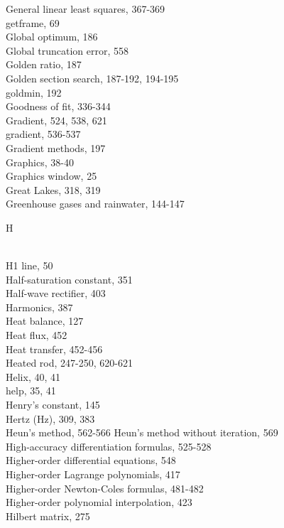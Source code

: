 \documentclass[../main.tex]{subfiles}
\begin{document}
\begin{multicols}{3}
    General linear least squares, 367-369\\
    getframe, 69\\
    Global optimum, 186\\
    Global truncation error, 558\\
    Golden ratio, 187\\
    Golden section search, 187-192, 194-195\\
    goldmin, 192\\
    Goodness of fit, 336-344\\
    Gradient, 524, 538, 621\\
    gradient, 536-537\\
    Gradient methods, 197\\
    Graphics, 38-40\\
    Graphics window, 25\\
    Great Lakes, 318, 319\\
    Greenhouse gases and rainwater, 144-147\vspace*{2mm}\\
    \begin{huge} H \end{huge}\\
    H1 line, 50\\
    Half-saturation constant, 351\\
    Half-wave rectifier, 403\\
    Harmonics, 387\\
    Heat balance, 127\\
    Heat flux, 452\\
    Heat transfer, 452-456\\
    Heated rod, 247-250, 620-621\\
    Helix, 40, 41\\
    help, 35, 41\\
    Henry's constant, 145\\
    Hertz (Hz), 309, 383\\
    Heun's method, 562-566
    Heun's method without iteration, 569\\
    High-accuracy differentiation formulas, 525-528\\
    Higher-order differential equations, 548\\
    Higher-order Lagrange polynomials, 417\\
    Higher-order Newton-Coles formulas, 481-482\\
    Higher-order polynomial interpolation, 423\\
    Hilbert matrix, 275\\

\end{multicols}
\end{document}
